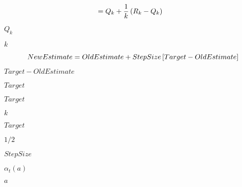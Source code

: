 \documentclass[10pt]{book}
\begin{document}
\begin{mdSnippets}
\begin{mdDisplaySnippet}[8e256cc3ed9e2c678df5497d27d9e2fe]
\[\begin{aligned}
&=  Q_k + \frac{1}{k} \left( {R_k - Q_k} \right)
\end{aligned}
\]%
\end{mdDisplaySnippet}%
\begin{mdInlineSnippet}[246c34c550a7977ad4c582df9b57f0b6]%
$Q_k$\end{mdInlineSnippet}%
\begin{mdInlineSnippet}[8ce4b16b22b58894aa86c421e8759df3]%
$k$\end{mdInlineSnippet}%
\begin{mdDisplaySnippet}[bd65684fa6047f03562a0c4e748fa1fa]%
\[%
NewEstimate  =  OldEstimate + StepSize \sqbra{Target - OldEstimate}
\]%
\end{mdDisplaySnippet}%
\begin{mdInlineSnippet}%
$Target - OldEstimate$\end{mdInlineSnippet}%
\begin{mdInlineSnippet}[c41a31890959544c6523af684561abe5]%
$Target$\end{mdInlineSnippet}%
\begin{mdInlineSnippet}[c41a31890959544c6523af684561abe5]%
$Target$\end{mdInlineSnippet}%
\begin{mdInlineSnippet}[8ce4b16b22b58894aa86c421e8759df3]%
$k$\end{mdInlineSnippet}%
\begin{mdInlineSnippet}[c41a31890959544c6523af684561abe5]%
$Target$\end{mdInlineSnippet}%
\begin{mdInlineSnippet}[975ca8804565c1a569450d61090b2743]%
$1/2$\end{mdInlineSnippet}%
\begin{mdInlineSnippet}[071449462d0c247e47313eb8c3129dd0]%
$StepSize$\end{mdInlineSnippet}%
\begin{mdInlineSnippet}[7f7486d5fcba38183b0e5b2b7842e9bf]%
$\alpha_t(a)$\end{mdInlineSnippet}%
\begin{mdInlineSnippet}[0cc175b9c0f1b6a831c399e269772661]%
$a$\end{mdInlineSnippet}%

\end{mdSnippets}
\end{document}

